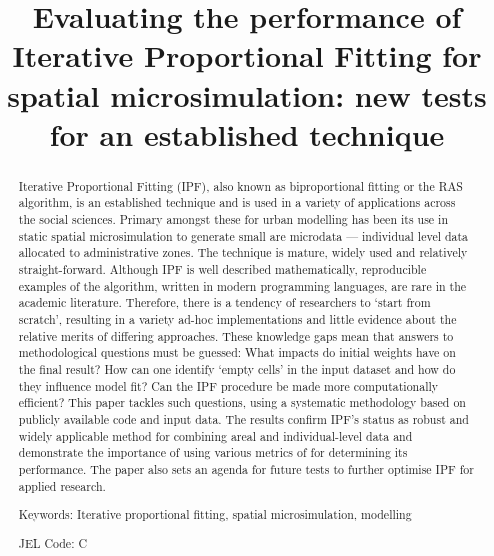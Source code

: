 \documentclass[a4paper,10pt]{article}
\title{Evaluating the performance of Iterative Proportional Fitting for spatial microsimulation: new tests for an established technique}
\begin{document}
\maketitle

\begin{abstract}
Iterative Proportional Fitting (IPF), also known as biproportional fitting or the RAS algorithm,
is an established technique and
is used in a variety of applications across the social sciences. Primary amongst these
for urban modelling has been its use in
static spatial microsimulation to generate small are microdata --- individual
level data allocated to administrative zones.
The technique is mature, widely used and relatively straight-forward.
Although IPF is well described mathematically, reproducible examples of the
algorithm, written in modern programming languages, are rare in the academic
literature. Therefore, there is  a tendency of researchers to `start from
scratch', resulting in a variety ad-hoc implementations and little evidence about the relative merits of differing approaches.
These knowledge gaps mean that answers to methodological questions must be guessed:
What impacts do initial weights have on the final result?
How can one identify `empty cells' in the input dataset
and how do they influence model fit? Can the IPF procedure
be made more computationally efficient?
This paper tackles such questions, using a systematic methodology 
based on publicly available code and input data. 
The results confirm IPF's status as robust and widely applicable 
method for combining areal and individual-level data and demonstrate the importance
of using various metrics of for determining its performance.
The paper also sets an agenda for future tests
to further optimise IPF for applied research.

Keywords: Iterative proportional fitting, spatial microsimulation, modelling

JEL Code: C
\end{abstract}
\end{document}
